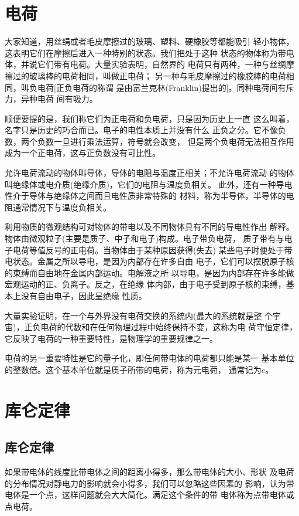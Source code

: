 \section{电荷}
大家知道，用丝绢或者毛皮摩擦过的玻璃、塑料、硬橡胶等都能吸引
轻小物体，这表明它们在摩擦后进入一种特别的状态。我们把处于这种
状态的物体称为带电体，并说它们带有电荷。大量实验表明，自然界的
电荷只有两种，一种与丝绸摩擦过的玻璃棒的电荷相同，叫做正电荷；
另一种与毛皮摩擦过的橡胶棒的电荷相同，叫负电荷[正负电荷的称谓
是由富兰克林(Franklin)提出的]。同种电荷间有斥力，异种电荷
间有吸力。

顺便要提的是，我们称它们为正电荷和负电荷，只是因为历史上一直
这么叫着，名字只是历史的巧合而已。电子的电性本质上并没有什么
正负之分。它不像负数，两个负数一旦进行乘法运算，符号就会改变，
但是两个负电荷无法相互作用成为一个正电荷，这与正负数没有可比性。

允许电荷流动的物体叫导体，导体的电阻与温度正相关；不允许电荷流动
的物体叫绝缘体或电介质(绝缘介质)，它们的电阻与温度负相关。
此外，还有一种导电性介于导体与绝缘体之间而且电性质非常特殊的
材料，称为半导体，半导体的电阻通常情况下与温度负相关。

利用物质的微观结构可对物体的带电以及不同物体具有不同的导电性作出
解释。物体由微观粒子(主要是质子、中子和电子)构成。电子带负电荷，
质子带有与电子电荷等值反号的正电荷。当物体由于某种原因获得(失去)
某些电子时便处于带电状态。金属之所以导电，是因为内部存在许多自由
电子，它们可以摆脱原子核的束缚而自由地在金属内部运动。电解液之所
以导电，是因为内部存在许多能做宏观运动的正、负离子。反之，在绝缘
体内部，由于电子受到原子核的束缚，基本上没有自由电子，因此呈绝缘
性质。

大量实验证明，在一个与外界没有电荷交换的系统内(最大的系统就是整
个宇宙)，正负电荷的代数和在任何物理过程中始终保持不变，这称为电
荷守恒定律，它反映了电荷的一种重要特性，是物理学的重要规律之一。

电荷的另一重要特性是它的量子化，即任何带电体的电荷都只能是某一
基本单位的整数倍。这个基本单位就是质子所带的电荷，称为元电荷，
通常记为$e$。
\section{库仑定律}
\subsection{库仑定律}
如果带电体的线度比带电体之间的距离小得多，那么带电体的大小、形状
及电荷的分布情况对静电力的影响就会小得多，我们可以忽略这些因素的
影响，认为带电体是一个点，这样问题就会大大简化。满足这个条件的带
电体称为点带电体或点电荷。

